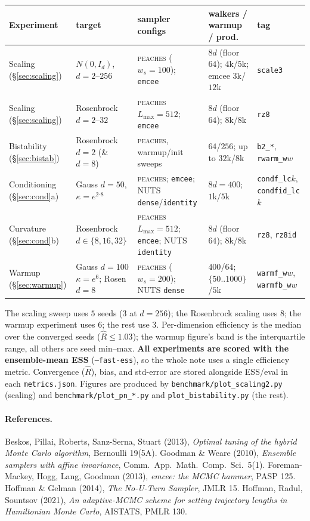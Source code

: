 \documentclass[11pt]{article}
\begin{document}
\begin{center}\small
\begin{tabular}{lllll}
\toprule
Experiment & target & sampler configs & walkers / warmup / prod. & tag \\
\midrule
Scaling (\S\ref{sec:scaling})
  & $N(0,I_d)$, $d{=}2$--$256$
  & \textsc{peaches} ($w_s{=}100$); \texttt{emcee}
  & $8d$ (floor $64$); $4$k/$5$k; emcee $3$k/$12$k & \texttt{scale3} \\
Scaling (\S\ref{sec:scaling})
  & Rosenbrock $d{=}2$--$32$
  & \textsc{peaches} $L_{\max}{=}512$; \texttt{emcee}
  & $8d$ (floor $64$); $8$k/$8$k & \texttt{rz8} \\
Bistability (\S\ref{sec:bistab})
  & Rosenbrock $d{=}2$ (\&\ $d{=}8$)
  & \textsc{peaches}, warmup/init sweeps
  & $64$/$256$; up to $32$k/$8$k & \texttt{b2\_*}, \texttt{rwarm\_w$w$} \\
Conditioning (\S\ref{sec:cond}a)
  & Gauss $d{=}50$, $\kappa{=}e^{2\text{-}8}$
  & \textsc{peaches}; \texttt{emcee}; NUTS \texttt{dense}/\texttt{identity}
  & $8d{=}400$; $1$k/$5$k & \texttt{condf\_lc$k$}, \texttt{condfid\_lc$k$} \\
Curvature (\S\ref{sec:cond}b)
  & Rosenbrock $d{\in}\{8,16,32\}$
  & \textsc{peaches} $L_{\max}{=}512$; \texttt{emcee}; NUTS \texttt{identity}
  & $8d$ (floor $64$); $8$k/$8$k & \texttt{rz8}, \texttt{rz8id} \\
Warmup (\S\ref{sec:warmup})
  & Gauss $d{=}100$ $\kappa{=}e^6$; Rosen $d{=}8$
  & \textsc{peaches} ($w_s{=}200$); NUTS \texttt{dense}
  & $400$/$64$; $\{50..1000\}$/$5$k & \texttt{warmf\_w$w$}, \texttt{warmfb\_w$w$} \\
\bottomrule
\end{tabular}
\end{center}
\noindent
The scaling sweep uses $5$ seeds ($3$ at $d{=}256$); the Rosenbrock scaling uses
$8$; the warmup experiment uses $6$; the rest use $3$. Per-dimension efficiency is
the median over the converged seeds ($\hat R\le1.03$); the warmup figure's band is
the interquartile range, all others are seed min--max. \textbf{All experiments are
scored with the ensemble-mean ESS} (\texttt{--fast-ess}), so the whole note uses a
single efficiency metric. Convergence ($\hat R$), bias, and std-error are stored
alongside ESS/eval in each
\texttt{metrics.json}. Figures are produced by
\texttt{benchmark/plot\_scaling2.py} (scaling) and
\texttt{benchmark/plot\_pn\_*.py} and \texttt{plot\_bistability.py} (the rest).

\paragraph{References.}
{\footnotesize
Beskos, Pillai, Roberts, Sanz-Serna, Stuart (2013), \emph{Optimal tuning of the
hybrid Monte Carlo algorithm}, Bernoulli 19(5A). \;
Goodman \& Weare (2010), \emph{Ensemble samplers with affine invariance}, Comm.\
App.\ Math.\ Comp.\ Sci.\ 5(1). \;
Foreman-Mackey, Hogg, Lang, Goodman (2013), \emph{emcee: the MCMC hammer}, PASP
125. \;
Hoffman \& Gelman (2014), \emph{The No-U-Turn Sampler}, JMLR 15. \;
Hoffman, Radul, Sountsov (2021), \emph{An adaptive-MCMC scheme for setting
trajectory lengths in Hamiltonian Monte Carlo}, AISTATS, PMLR 130.
}
\end{document}

